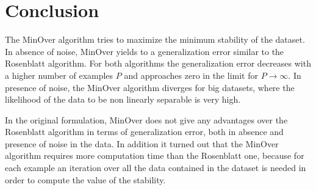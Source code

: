 \section{Conclusion}
\label{sec:conclusion}

The MinOver algorithm tries to maximize the minimum stability of the dataset.
In absence of noise, MinOver yields to a generalization error similar to the Rosenblatt algorithm.
For both algorithms the generalization error decreases with a higher number of examples $P$ and approaches zero in the limit for $P \to \infty$.
In presence of noise, the MinOver algorithm diverges for big datasets, where the likelihood of the data to be non linearly separable is very high.

In the original formulation, MinOver does not give any advantages over the Rosenblatt algorithm in terms of generalization error, both in absence and presence of noise in the data.
In addition it turned out that the MinOver algorithm requires more computation time than the Rosenblatt one, because for each example an iteration over all the data contained in the
dataset is needed in order to compute the value of the stability.